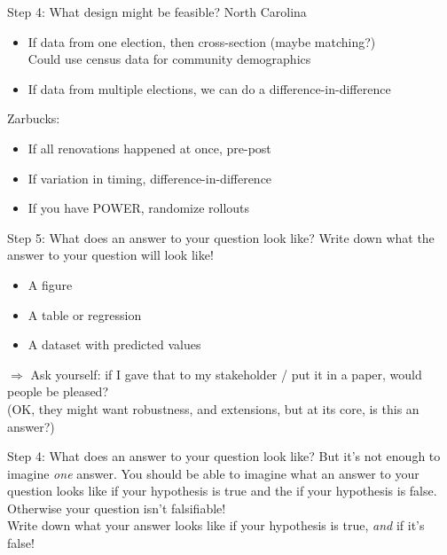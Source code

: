 \documentclass[11pt]{beamer}
\begin{document}
\begin{frame}[c]{Step 4: What design might be feasible?}
North Carolina
\begin{itemize}
  \item If data from one election, then cross-section (maybe matching?) \\
  Could use census data for community demographics
  \item If data from multiple elections, we can do a difference-in-difference
\end{itemize}
\pause
Zarbucks:
\begin{itemize}
  \item If all renovations happened at once, pre-post
  \item If variation in timing, difference-in-difference
  \pause \item If you have POWER, randomize rollouts
\end{itemize}
\end{frame}

\begin{frame}[c]{Step 5: What does \alert{an answer} to your question look like?}
\alert{Write down} what the answer to your question will look like!
\pause
\begin{itemize}
  \item A figure
  \item A table or regression
  \item A dataset with predicted values
\end{itemize}
\pause
$\Rightarrow$ Ask yourself: if I gave that to my stakeholder / put it in a paper, would people be pleased?\\
\pause (OK, they might want robustness, and extensions, but at its core, is this an answer?)
\end{frame}


\begin{frame}[c]{Step 4: What does \alert{an answer} to your question look like?}
But it's not enough to imagine \emph{one} answer. You should be able to imagine what an answer to your question looks like if your hypothesis \alert{is true} and the if your hypothesis \alert{is false}. \\
\pause Otherwise your question isn't falsifiable! \\
\vspace*{0.3cm}
Write down what your answer looks like if your hypothesis is true, \emph{and} if it's false!
\end{frame}
\end{document}
